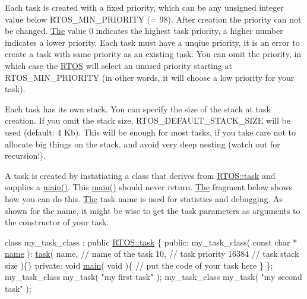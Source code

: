 Each task is created with a fixed priority, which can be any unsigned integer value below R\+T\+O\+S\+\_\+\+M\+I\+N\+\_\+\+P\+R\+I\+O\+R\+I\+TY (= 98). After creation the priority can not be changed. \hyperlink{class_the}{The} value 0 indicates the highest task priority, a higher number indicates a lower priority. Each task must have a unqiue priority, it is an error to create a task with same priority as an existing task. You can omit the priority, in which case the \hyperlink{class_r_t_o_s}{R\+T\+OS} will select an unused priority starting at R\+T\+O\+S\+\_\+\+M\+I\+N\+\_\+\+P\+R\+I\+O\+R\+I\+TY (in other words, it will choose a low priority for your task).

Each task has its own stack. You can specify the size of the stack at task creation. If you omit the stack size, R\+T\+O\+S\+\_\+\+D\+E\+F\+A\+U\+L\+T\+\_\+\+S\+T\+A\+C\+K\+\_\+\+S\+I\+ZE will be used (default\+: 4 Kb). This will be enough for most tasks, if you take care not to allocate big things on the stack, and avoid very deep nesting (watch out for recursion!).

A task is created by instatiating a class that derives from \hyperlink{class_r_t_o_s_1_1task}{R\+T\+O\+S\+::task} and supplies a \hyperlink{class_r_t_o_s_1_1task_addc6d52f8792ddba1158d7ae5ef0037d}{main()}. This \hyperlink{class_r_t_o_s_1_1task_addc6d52f8792ddba1158d7ae5ef0037d}{main()} should never return. \hyperlink{class_the}{The} fragment below shows how you can do this. \hyperlink{class_the}{The} task name is used for statistics and debugging. As shown for the name, it might be wise to get the task parameters as arguments to the constructor of your task.


\begin{DoxyCode}
\textcolor{keyword}{class }my\_task\_class : \textcolor{keyword}{public} \hyperlink{class_r_t_o_s_1_1task}{RTOS::task} \{
\textcolor{keyword}{public}:
   my\_task\_class( \textcolor{keyword}{const} \textcolor{keywordtype}{char} * \hyperlink{class_r_t_o_s_1_1task_a56e4d07750c49b6620b0407013b177c1}{name} ):
      \hyperlink{class_r_t_o_s_1_1task_a2a6ca33f9fb074225304f29561c5d826}{task}(
         name,  \textcolor{comment}{// name of the task}
         10,    \textcolor{comment}{// task priority}
         16384  \textcolor{comment}{// task stack size}
      )\{\}
\textcolor{keyword}{private}:
   \textcolor{keywordtype}{void} \hyperlink{class_r_t_o_s_1_1task_addc6d52f8792ddba1158d7ae5ef0037d}{main}( \textcolor{keywordtype}{void} )\{
      \textcolor{comment}{// put the code of your task here}
   \}
\};
my\_task\_class my\_task( \textcolor{stringliteral}{"my first task"} );
my\_task\_class my\_task( \textcolor{stringliteral}{"my second task"} );
\end{DoxyCode}


